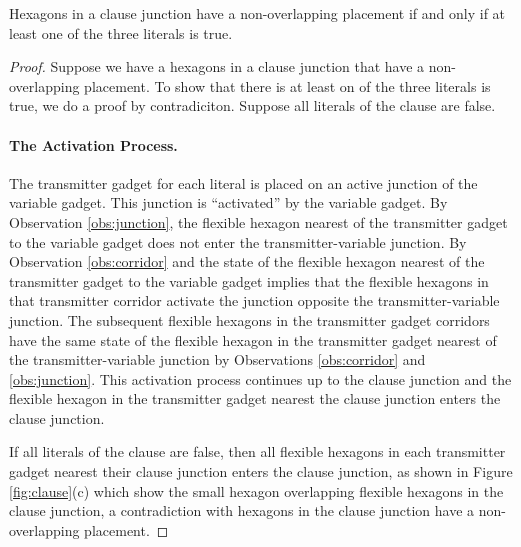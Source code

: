 \begin{lem}\label{lem:aux-1}
Hexagons in a clause junction have a non-overlapping placement if and only if at least one of the three literals is true.
\end{lem}
\begin{proof}
Suppose we have a hexagons in a clause junction that have a non-overlapping placement.
To show that there is at least on of the three literals is true,  we do a proof by contradiciton.
Suppose all literals of the clause are false.

\paragraph{The Activation Process.} 
The transmitter gadget for each literal is placed on an active junction of the variable gadget. 
This junction is ``activated'' by the variable gadget.  
By Observation \ref{obs:junction}, the flexible hexagon nearest of the transmitter gadget to the variable gadget does not enter the transmitter-variable junction.
By Observation \ref{obs:corridor} and the state of the flexible hexagon nearest of the transmitter gadget to the variable gadget implies that the flexible hexagons in that transmitter corridor activate the junction opposite the transmitter-variable junction.
The subsequent flexible hexagons in the transmitter gadget corridors have the same state of the flexible hexagon in the transmitter gadget nearest of the transmitter-variable junction by Observations \ref{obs:corridor} and \ref{obs:junction}.
This activation process continues up to the clause junction and the flexible hexagon in the transmitter gadget nearest the clause junction enters the clause junction.

If all literals of the clause are false, then all flexible hexagons in each transmitter gadget nearest their clause junction enters the clause junction, as shown in Figure \ref{fig:clause}(c) which show the small hexagon overlapping flexible hexagons in the clause junction, a contradiction with hexagons in the clause junction have a non-overlapping placement.
\end{proof}

